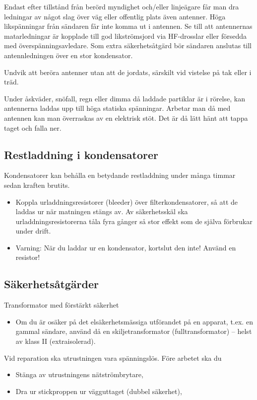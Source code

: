 Endast efter tillstånd från berörd myndighet och/eller linjeägare får
man dra ledningar av något slag över väg eller offentlig plats även
antenner.  Höga likspänningar från sändaren får inte komma ut i
antennen. Se till att antennernas matarledningar är kopplade till god
likströmsjord via HF-drosslar eller försedda med
överspänningsavledare.  Som extra säkerhetsåtgärd bör sändaren
anslutas till antennledningen över en stor kondensator.

Undvik att beröra antenner utan att de jordats, särskilt vid vistelse
på tak eller i träd.

Under åskväder, snöfall, regn eller dimma då laddade partiklar är i
rörelse, kan antennerna laddas upp till höga statiska
spänningar. Arbetar man då med antennen kan man överraskas av en
elektrisk stöt. Det är då lätt hänt att tappa taget och falla ner.

\subsection{Restladdning i kondensatorer}

Kondensatorer kan behålla en betydande restladdning under många timmar
sedan kraften brutits.
\begin{itemize}
\item Koppla urladdningsresistorer (bleeder) över filterkondensatorer,
  så att de laddas ur när matningen stängs av. Av säkerhetsskäl ska
  urladdningsresistorerna tåla fyra gånger så stor effekt som de
  själva förbrukar under drift.
\item Varning: När du laddar ur en kondensator, kortslut den inte! Använd
  en resistor!
\end{itemize}

\subsection{Säkerhetsåtgärder}

Transformator med förstärkt säkerhet
\begin{itemize}
\item Om du är osäker på det elsäkerhetsmässiga utförandet på en
  apparat, t.ex. en gammal sändare, använd då en skiljetransformator
  (fulltransformator) -- helst av klass II (extraisolerad).
\end{itemize}

Vid reparation ska utrustningen vara spänningslös. Före arbetet ska du
\begin{itemize}
\item Stänga av utrustningens nätströmbrytare,
\item Dra ur stickproppen ur vägguttaget (dubbel säkerhet),
\end{itemize}

